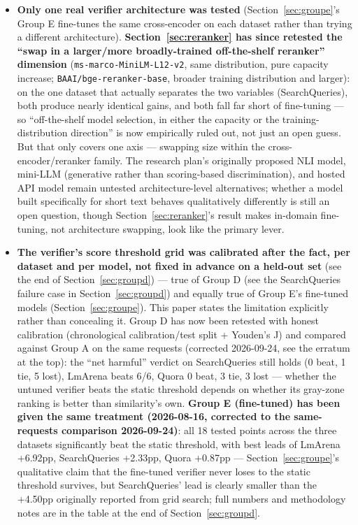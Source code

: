 \documentclass[11pt]{article}
\begin{document}
\begin{itemize}[leftmargin=*]
  \item \textbf{Only one real verifier architecture was tested} (Section~\ref{sec:groupe}'s Group E fine-tunes the same cross-encoder on each dataset rather than trying a different architecture). \textbf{Section~\ref{sec:reranker} has since retested the ``swap in a larger/more broadly-trained off-the-shelf reranker'' dimension} (\texttt{ms-marco-Mini\allowbreak{}LM-L12-v2}, same distribution, pure capacity increase; \texttt{BAAI/\allowbreak{}bge-reranker-base}, broader training distribution and larger): on the one dataset that actually separates the two variables (SearchQueries), both produce nearly identical gains, and both fall far short of fine-tuning --- so ``off-the-shelf model selection, in either the capacity or the training-distribution direction'' is now empirically ruled out, not just an open guess. But that only covers one axis --- swapping size within the cross-encoder/reranker family. The research plan's originally proposed NLI model, mini-LLM (generative rather than scoring-based discrimination), and hosted API model remain untested architecture-level alternatives; whether a model built specifically for short text behaves qualitatively differently is still an open question, though Section~\ref{sec:reranker}'s result makes in-domain fine-tuning, not architecture swapping, look like the primary lever.
  \item \textbf{The verifier's score threshold grid was calibrated after the fact, per dataset and per model, not fixed in advance on a held-out set} (see the end of Section~\ref{sec:groupd}) --- true of Group D (see the SearchQueries failure case in Section~\ref{sec:groupd}) and equally true of Group E's fine-tuned models (Section~\ref{sec:groupe}). This paper states the limitation explicitly rather than concealing it. Group D has now been retested with honest calibration (chronological calibration/test split + Youden's J) and compared against Group A on the same requests (corrected 2026-09-24, see the erratum at the top): the ``net harmful'' verdict on SearchQueries still holds (0 beat, 1 tie, 5 lost), LmArena beats 6/6, Quora 0 beat, 3 tie, 3 lost --- whether the untuned verifier beats the static threshold depends on whether its gray-zone ranking is better than similarity's own. \textbf{Group E (fine-tuned) has been given the same treatment (2026-08-16, corrected to the same-requests comparison 2026-09-24)}: all 18 tested points across the three datasets significantly beat the static threshold, with best leads of LmArena +6.92pp, SearchQueries +2.33pp, Quora +0.87pp --- Section~\ref{sec:groupe}'s qualitative claim that the fine-tuned verifier never loses to the static threshold survives, but SearchQueries' lead is clearly smaller than the +4.50pp originally reported from grid search; full numbers and methodology notes are in the table at the end of Section~\ref{sec:groupd}.

\end{itemize}
\end{document}
